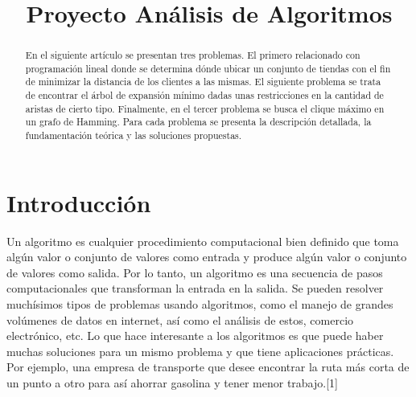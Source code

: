 \documentclass[conference,compsoc]{IEEEtran}
\begin{document}
%
\title{Proyecto Análisis de Algoritmos}


\author{
\and
{}
}






\maketitle

\begin{abstract}
En el siguiente artículo se presentan tres problemas. El primero relacionado con programación lineal donde se determina dónde ubicar un conjunto de tiendas con el fin de minimizar la distancia de los clientes a las mismas. El siguiente problema se trata de encontrar el árbol de expansión mínimo dadas unas restricciones en la cantidad de aristas de cierto tipo. Finalmente, en el tercer problema se busca el clique máximo en un grafo de Hamming. Para cada problema se presenta la descripción detallada, la fundamentación teórica y las soluciones propuestas.
\end{abstract}





\IEEEpeerreviewmaketitle

\section{Introducción}
Un algoritmo es cualquier procedimiento computacional bien definido que toma algún valor o conjunto de valores como entrada y produce algún valor o conjunto de valores como salida. Por lo tanto, un algoritmo es una secuencia de pasos computacionales que transforman la entrada en la salida. Se pueden resolver muchísimos tipos de problemas usando algoritmos, como el manejo de grandes volúmenes de datos en internet, así como el análisis de estos, comercio electrónico, etc. Lo que hace interesante a los algoritmos es que puede haber muchas soluciones para un mismo problema y que tiene aplicaciones prácticas. Por ejemplo, una empresa de transporte que desee encontrar la ruta más corta de un punto a otro para así ahorrar gasolina y tener menor trabajo.[1]
\end{document}
